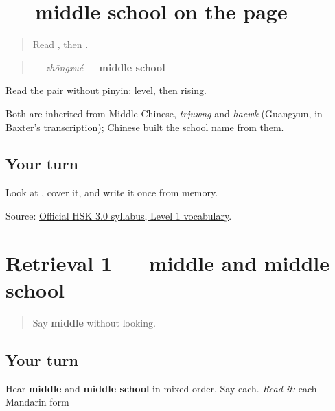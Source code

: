 \section[\texorpdfstring{\zh{中学} (zhōngxué)}{中学 (zhōngxué)}]{ — middle school on the page}

\label{lesson:ZH-C15-zhongxue}



\begin{quote}
Read , then .
\end{quote}

\begin{cousinweb}
\begin{quote}
\textbf{} — \emph{zhōngxué} — \textbf{middle school}
\end{quote}

Read the pair without pinyin: level, then rising.

Both are inherited from Middle Chinese, \emph{trjuwng} and \emph{haewk} (Guangyun, in Baxter's transcription); Chinese built the school name from them.
\end{cousinweb}

\subsection*{Your turn}
Look at \textbf{}, cover it, and write it once from memory.

\begin{tcolorbox}[breakable,colback=teal!4,colframe=teal!35!black,title={Before you move on}]
Source: \href{https://hsk.cn-bj.ufileos.com/3.0/\%E6\%96\%B0\%E7\%89\%88HSK\%E8\%80\%83\%E8\%AF\%95\%E5\%A4\%A7\%E7\%BA\%B21219.pdf}{Official HSK 3.0 syllabus, Level 1 vocabulary}.
\end{tcolorbox}
\section[Practice]{Retrieval 1 — middle and middle school}

\label{lesson:ZH-R15-school-map-1}



\begin{quote}
Say \textbf{middle} without looking.
\end{quote}

\subsection*{Your turn}
Hear \textbf{middle} and \textbf{middle school} in mixed order. Say each. \emph{Read it:} each Mandarin form

